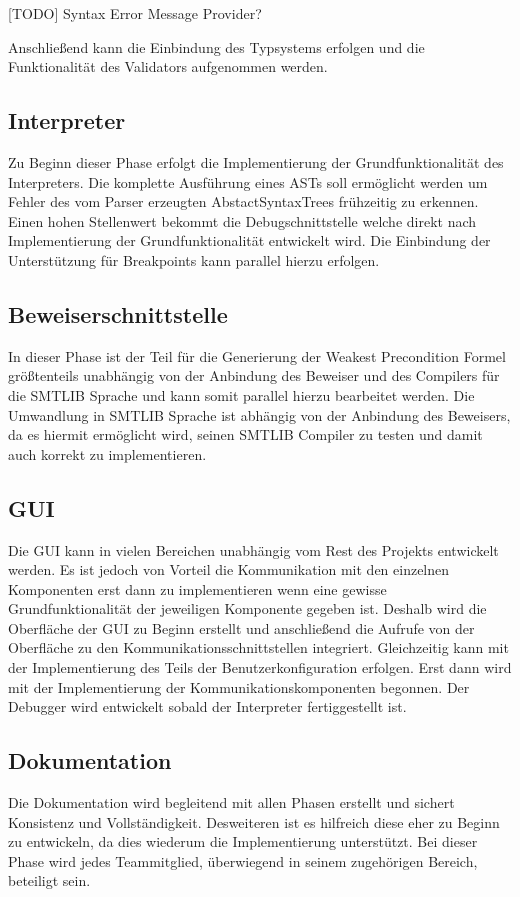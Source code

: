 [TODO] Syntax Error Message Provider?

Anschließend kann die Einbindung des Typsystems erfolgen und die Funktionalität des Validators aufgenommen werden.

\subsection{Interpreter}
Zu Beginn dieser Phase erfolgt die Implementierung der Grundfunktionalität des Interpreters. Die komplette Ausführung eines ASTs soll  ermöglicht werden um Fehler des vom Parser erzeugten AbstactSyntaxTrees frühzeitig zu erkennen. Einen hohen Stellenwert bekommt die Debugschnittstelle welche direkt nach Implementierung der Grundfunktionalität entwickelt wird. Die Einbindung der Unterstützung für Breakpoints kann parallel hierzu erfolgen.

\subsection{Beweiserschnittstelle}
In dieser Phase ist der Teil für die Generierung der Weakest Precondition Formel größtenteils unabhängig von der Anbindung des Beweiser und des Compilers für die SMTLIB Sprache und kann somit parallel hierzu bearbeitet werden. Die Umwandlung in SMTLIB Sprache ist abhängig von der Anbindung des Beweisers, da es hiermit ermöglicht wird, seinen SMTLIB Compiler zu testen und damit auch korrekt zu implementieren.

\subsection{GUI}
Die GUI kann in vielen Bereichen unabhängig vom Rest des Projekts entwickelt werden. Es ist jedoch von Vorteil die Kommunikation mit den einzelnen Komponenten erst dann zu implementieren wenn eine gewisse Grundfunktionalität der jeweiligen Komponente gegeben ist. Deshalb wird die Oberfläche der GUI zu Beginn erstellt und anschließend die Aufrufe von der Oberfläche zu den Kommunikationsschnittstellen integriert. Gleichzeitig kann mit der Implementierung des Teils der Benutzerkonfiguration erfolgen. Erst dann wird mit der Implementierung der Kommunikationskomponenten begonnen. Der Debugger wird entwickelt sobald der Interpreter fertiggestellt ist.

\subsection{Dokumentation}
Die Dokumentation wird begleitend mit allen Phasen erstellt und sichert Konsistenz und Vollständigkeit. Desweiteren ist es hilfreich diese eher zu Beginn zu entwickeln, da dies wiederum die Implementierung unterstützt. Bei dieser Phase wird jedes Teammitglied, überwiegend in seinem zugehörigen Bereich, beteiligt sein.

